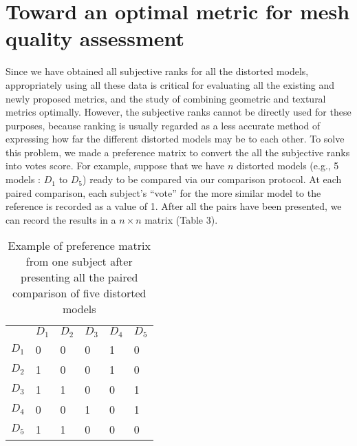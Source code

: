 \section{Toward an optimal metric for mesh quality assessment}
Since we have obtained all subjective ranks for all the distorted models, appropriately using all these data is critical for evaluating all the existing and newly proposed metrics, and the study of combining geometric and textural metrics optimally. However, the subjective ranks cannot be directly used for these purposes, because ranking is usually regarded as a less accurate method of expressing how far the different distorted models may be to each other.  To solve this problem, we made a preference matrix \cite{Ledda_2005} to convert the all the subjective ranks into votes score. For example, suppose that we have $n$ distorted models (e.g., 5 models : $D_1$ to $D_5$) ready to be compared via our comparison protocol.   At each paired comparison, each subject’s “vote” for the more similar model to the reference is recorded as a value of 1. After all the pairs have been presented, we can record the results in a $n \times n$ matrix (Table 3).
\begin{table}[]
\centering
\caption{Example of preference matrix from one subject after presenting all the paired comparison of five distorted models }
\label{my-label}
\begin{tabular}{llllll}
            & $D_1$ & $D_2$ & $D_3$ & $D_4$ & $D_5$ \\
$D_1$ & 0           & 0           & 0           & 1           & 0           \\
$D_2$ & 1           & 0           & 0           & 1           & 0           \\
$D_3$ & 1           & 1           & 0           & 0           & 1           \\
$D_4$ & 0           & 0           & 1           & 0           & 1           \\
$D_5$ & 1           & 1           & 0           & 0           & 0          
\end{tabular}
\end{table}
